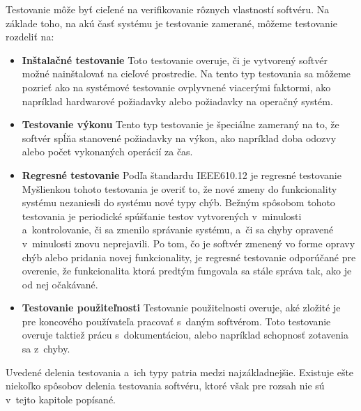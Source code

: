 \noindent Testovanie môže byť cieľené na verifikovanie rôznych vlastností softvéru. 
Na základe toho, na akú časť systému je 
testovanie zamerané, môžeme testovanie rozdeliť na:
\begin{itemize}
\item \textbf{Inštalačné testovanie}
Toto testovanie overuje, či je vytvorený softvér možné nainštalovať
na cieľové prostredie. Na tento typ testovania sa môžeme pozrieť ako na 
systémové testovanie ovplyvnené viacerými faktormi, ako napríklad 
hardwarové požiadavky alebo požiadavky na operačný systém. 

\item \textbf{Testovanie výkonu}
Tento typ testovanie je špeciálne zameraný na to, že softvér spĺňa 
stanovené požiadavky na výkon, ako napríklad doba odozvy alebo počet 
vykonaných operácií za čas. 

\item \textbf{Regresné testovanie} 
\label{sekcia:regresne_testovanie}
Podľa štandardu IEEE610.12 \cite{Ieee_glossary} je regresné testovanie 
Myšlienkou tohoto testovania je overiť to, že nové zmeny do funkcionality 
systému nezaniesli do systému nové typy chýb.
Bežným spôsobom tohoto testovania je periodické spúšťanie testov 
vytvorených v~minulosti a~kontrolovanie, či sa zmenilo správanie
systému, a~či sa chyby opravené v~minulosti znovu neprejavili. Po tom, 
čo je softvér zmenený vo forme opravy chýb alebo pridania novej 
funkcionality, je regresné testovanie odporúčané pre overenie, že 
funkcionalita ktorá predtým fungovala sa stále správa tak, ako je od 
nej očakávané.

\item \textbf{Testovanie použiteľnosti}
Testovanie použitelnosti overuje, aké zložité je pre koncového 
používateľa pracovať s~daným softvérom. Toto testovanie overuje taktiež 
prácu s~dokumentáciou, alebo napríklad schopnosť zotavenia sa z~chyby. 
\end{itemize}

Uvedené delenia testovania a~ich typy patria medzi najzákladnejšie. 
Existuje ešte niekoľko spôsobov delenia testovania softvéru, ktoré však 
pre rozsah nie sú v~tejto kapitole popísané.



